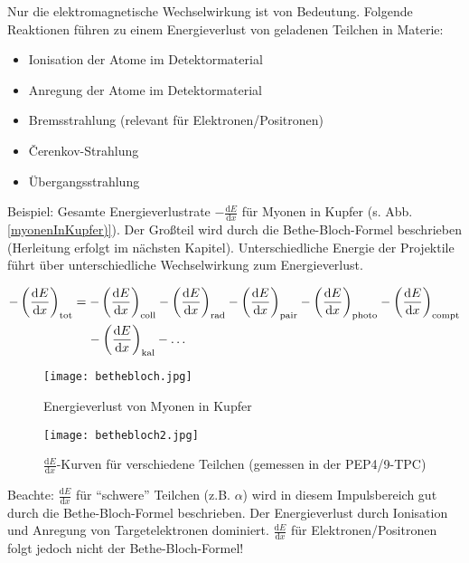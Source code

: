 \FloatBarrier

Nur die elektromagnetische Wechselwirkung ist von Bedeutung. Folgende Reaktionen führen zu einem
Energieverlust von geladenen Teilchen in Materie:

\begin{itemize}
  \item Ionisation der Atome im Detektormaterial
  \item Anregung der Atome im Detektormaterial
  \item Bremsstrahlung (relevant für Elektronen/Positronen)
  \item \v{C}erenkov-Strahlung
  \item Übergangsstrahlung
\end{itemize}
 
 Beispiel: Gesamte Energieverlustrate $-\frac{\mathrm{d}E}{\mathrm{d}x}$ für Myonen in Kupfer (s. Abb.
 \ref{myonenInKupfer)}). Der Großteil wird durch die Bethe-Bloch-Formel beschrieben (Herleitung
 erfolgt im nächsten Kapitel).
Unterschiedliche Energie der Projektile führt über unterschiedliche Wechselwirkung zum
Energieverlust.

\begin{align*}
-\left(\frac{\mathrm{d}E}{\mathrm{d}x}\right)_{\text{tot}} &= -\left(\frac{\mathrm{d}E}{\mathrm{d}x}\right)_{\text{coll}}
-\left(\frac{\mathrm{d}E}{\mathrm{d}x}\right)_{\text{rad}} -\left(\frac{\mathrm{d}E}{\mathrm{d}x}\right)_{\text{pair}}
-\left(\frac{\mathrm{d}E}{\mathrm{d}x}\right)_{\text{photo}} -\left(\frac{\mathrm{d}E}{\mathrm{d}x}\right)_{\text{compt}} \\
&\hspace{4mm} -\left(\frac{\mathrm{d}E}{\mathrm{d}x}\right)_{\text{kal}}-\ldots
\end{align*}
 
\begin{figure}
	\centering
	\texttt{[image: bethebloch.jpg]}
 	\caption{Energieverlust von Myonen in Kupfer}
 	\label{myonenInKupfer}
\end{figure}

\begin{figure}
	\centering
	\texttt{[image: bethebloch2.jpg]}
	\caption{$\frac{\mathrm{d}E}{\mathrm{d}x}$-Kurven für verschiedene Teilchen (gemessen in der
	PEP4/9-TPC)}
	\label{}
\end{figure}
 
 Beachte: $\frac{\mathrm{d}E}{\mathrm{d}x}$ für "`schwere"' Teilchen (z.B. $\alpha$) wird in diesem Impulsbereich gut
 durch die Bethe-Bloch-Formel beschrieben. Der Energieverlust durch Ionisation und Anregung von
 Targetelektronen dominiert. $\frac{\mathrm{d}E}{\mathrm{d}x}$ für Elektronen/Positronen folgt jedoch nicht der
 Bethe-Bloch-Formel!
 
 \FloatBarrier